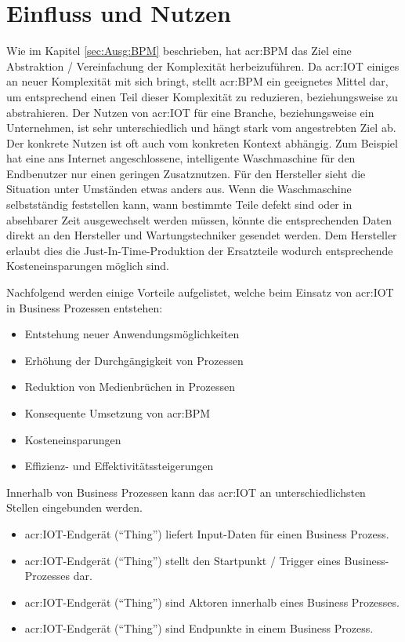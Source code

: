 \section{Einfluss und Nutzen}
Wie im Kapitel \ref{sec:Ausg:BPM}  beschrieben, hat \gls{acr:BPM} das Ziel eine Abstraktion / Vereinfachung der Komplexität herbeizuführen. Da \gls{acr:IOT} einiges an neuer Komplexität mit sich bringt, stellt \gls{acr:BPM} ein geeignetes Mittel dar, um entsprechend einen Teil dieser Komplexität zu reduzieren, beziehungsweise zu abstrahieren. Der Nutzen von \gls{acr:IOT} für eine Branche, beziehungsweise ein Unternehmen, ist sehr unterschiedlich und hängt stark vom angestrebten Ziel ab. Der konkrete Nutzen ist oft auch vom konkreten Kontext abhängig. Zum Beispiel hat eine ans Internet angeschlossene, intelligente Waschmaschine für den Endbenutzer nur einen geringen Zusatznutzen. Für den Hersteller sieht die Situation unter Umständen etwas anders aus. Wenn die Waschmaschine selbstständig feststellen kann, wann bestimmte Teile defekt sind oder in absehbarer Zeit ausgewechselt werden müssen, könnte die entsprechenden Daten direkt an den Hersteller und Wartungstechniker gesendet werden. Dem Hersteller erlaubt dies die Just-In-Time-Produktion der Ersatzteile wodurch entsprechende Kosteneinsparungen möglich sind.



Nachfolgend werden einige Vorteile aufgelistet, welche beim Einsatz von \gls{acr:IOT} in Business Prozessen entstehen:
\begin{itemize}
\item Entstehung neuer Anwendungsmöglichkeiten
\item Erhöhung der Durchgängigkeit von Prozessen
\item Reduktion von Medienbrüchen in Prozessen
\item Konsequente Umsetzung von \gls{acr:BPM}
\item Kosteneinsparungen
\item Effizienz- und Effektivitätssteigerungen
\end{itemize}

Innerhalb von Business Prozessen kann das \gls{acr:IOT} an unterschiedlichsten Stellen eingebunden werden.
\begin{itemize}
\item \gls{acr:IOT}-Endgerät ("`Thing"') liefert Input-Daten für einen Business Prozess.
\item \gls{acr:IOT}-Endgerät ("`Thing"') stellt den Startpunkt / Trigger eines Business-Prozesses dar.
\item \gls{acr:IOT}-Endgerät ("`Thing"') sind Aktoren innerhalb eines Business Prozesses.
\item \gls{acr:IOT}-Endgerät ("`Thing"') sind Endpunkte in einem Business Prozess.
\end{itemize}

